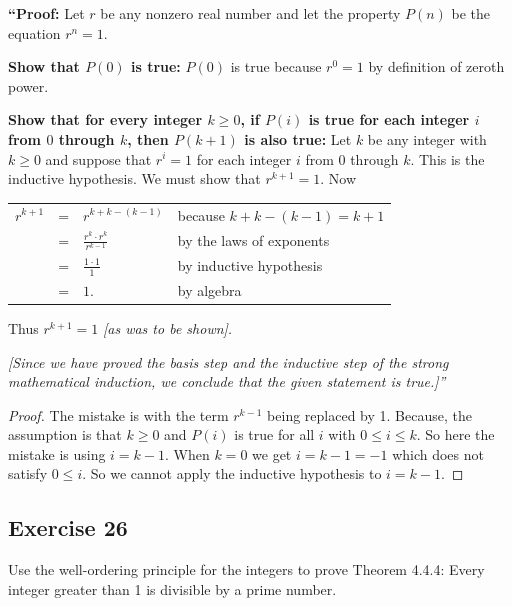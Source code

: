 \documentclass[14pt]{extarticle}
\newcommand{\dps}{\displaystyle}
\newcommand{\cy}{\color{cyan}}
\begin{document}
{\bf “Proof:} Let $r$ be any nonzero real number and let the property $P(n)$ be the equation $r^n = 1$.

{\bf Show that $P(0)$ is true:} $P(0)$ is true because $r^0 = 1$ by definition of zeroth power.

{\bf Show that for every integer $k \geq 0$, if $P(i)$ is true for each integer $i$ from $0$ through $k$, then $P(k + 1)$ is also true:} Let $k$ be any integer with $k \geq 0$ and suppose that $r^i = 1$ for each integer $i$ from $0$ through $k$. This is the inductive hypothesis. We must show that $r^{k+1} = 1$. Now

\begin{center}
\begin{tabular}{rcll}
$\dps r^{k+1}$ & = & $\dps r^{k + k - (k - 1)}$ & {\cy because $k + k - (k - 1) = k+1$} \\
\vspace{0.3cm}
 & = & $\dps \frac{r^k \cdot r^k}{r^{k-1}}$ & {\cy by the laws of exponents} \\
 & = & $\dps \frac{1 \cdot 1}{1}$ & {\cy by inductive hypothesis} \\
 & = & $\dps 1.$ & {\cy by algebra} 
\end{tabular}
\end{center}

Thus $r^{k+1} = 1$ {\it [as was to be shown].}

{\it [Since we have proved the basis step and the inductive
step of the strong mathematical induction, we conclude that the given statement is true.]”}

\begin{proof}
The mistake is with the term $r^{k-1}$ being replaced by 1. Because, the assumption is that $k \geq 0$ and $P(i)$ is true for all $i$ with $0 \leq i \leq k$. So here the mistake is using $i = k-1$. When $k = 0$ we get $i = k - 1 = -1$ which does not satisfy $0 \leq i$. So we cannot apply the inductive hypothesis to $i = k-1$.
\end{proof}

\subsection{Exercise 26}
Use the well-ordering principle for the integers to prove Theorem 4.4.4: Every integer greater than 1 is divisible by a prime number.
\end{document}

